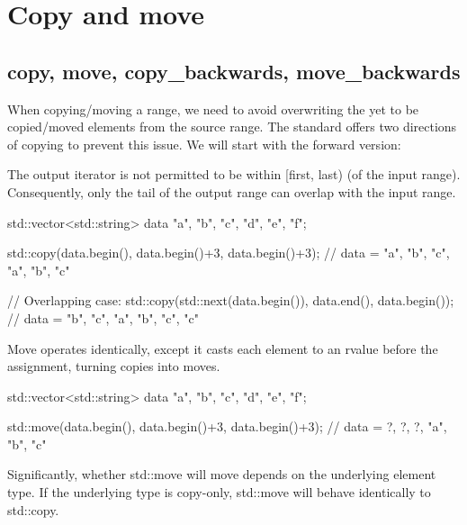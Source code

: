 \section{Copy and move}

\subsection{copy, move, copy\_backwards, move\_backwards}

When copying/moving a range, we need to avoid overwriting the yet to be copied/moved elements from the source range. The standard offers two directions of copying to prevent this issue. We will start with the forward version:



The output iterator is not permitted to be within [first, last) (of the input range). Consequently, only the tail of the output range can overlap with the input range.

\begin{box-note}
\begin{cppcode}
std::vector<std::string> data{ "a", "b", "c", "d", "e", "f"};

std::copy(data.begin(), data.begin()+3, data.begin()+3);
// data = { "a", "b", "c", "a", "b", "c" }

// Overlapping case:
std::copy(std::next(data.begin()), data.end(), data.begin());
// data = { "b", "c", "a", "b", "c", "c" }
\end{cppcode}
\end{box-note}

Move operates identically, except it casts each element to an rvalue before the assignment, turning copies into moves.

\begin{box-note}
\begin{cppcode}
std::vector<std::string> data{ "a", "b", "c", "d", "e", "f"};

std::move(data.begin(), data.begin()+3, data.begin()+3);
// data = { ?, ?, ?, "a", "b", "c" }
\end{cppcode}
\end{box-note}

Significantly, whether std::move will move depends on the underlying element type. If the underlying type is copy-only, std::move will behave identically to std::copy.

